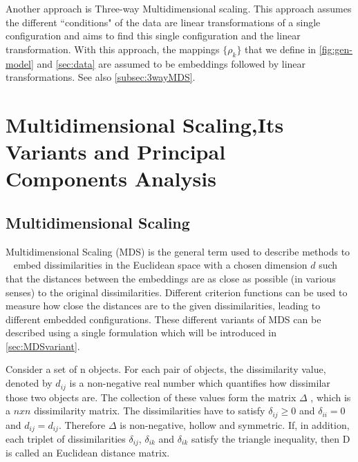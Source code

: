 \documentclass[12pt,oneside,final]{thesis}
\begin{document}
Another approach is Three-way Multidimensional scaling\cite{3wayNMDS,borg+groenen:1997}.
 This approach assumes the  different ``conditions" of the data are linear transformations of a single configuration and aims to find this single configuration and the linear transformation. With this approach, the mappings  $\{\rho_k \}$ that we define in \autoref{fig:gen-model} and \autoref{sec:data} are  assumed to be embeddings followed by linear transformations. See also \autoref{subsec:3wayMDS}.




\chapter{Multidimensional Scaling,Its Variants and Principal Components Analysis}
\label{sec:MDS}



\section{Multidimensional Scaling}
Multidimensional Scaling (MDS) is the general term used to describe methods to  ~\cite{CMDS,borg+groenen:1997,duin2005dissimilarity}  embed dissimilarities in the Euclidean space  with a chosen dimension $d$ such that the distances between the embeddings are as close as possible (in various senses) to the original dissimilarities. Different criterion functions can be used to measure how close the distances are  to the given dissimilarities, leading to different embedded configurations. These different variants of MDS can be described using a single formulation which will be introduced in \autoref{sec:MDSvariant}.

Consider a  set of n objects. For each pair of objects, the dissimilarity value, denoted by $d_{ij}$ is a non-negative real number which quantifies how dissimilar those two objects are. The collection of these values form the matrix $\Delta$ , which is  a $nxn$ dissimilarity matrix. %
The dissimilarities have to satisfy $\delta_{ij}\geq 0$ and $\delta_{ii}=0$ and $d_{ij}=d_{ij}$. Therefore  $\Delta$ is non-negative, hollow and symmetric. If, in addition, each triplet of dissimilarities $\delta_{ij}$, $\delta_{ik}$ and $\delta_{ik}$  satisfy the triangle inequality, then D is called  an Euclidean distance matrix.
\end{document}
